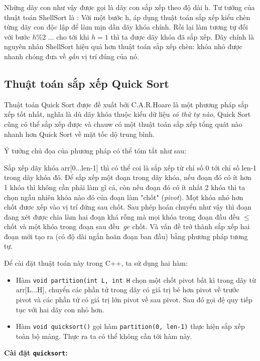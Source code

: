 \documentclass[8pt, a4paper]{article}
\newcommand{\mnt}[1]{\inputminted[frame=single, linenos=true, tabsize=4]{c++}{#1}}
\begin{document}
Những dãy con như vậy được gọi là dãy con sắp xếp theo độ dài h. Tư tưởng của thuật toán ShellSort là : Với một bước h, áp dụng thuật toán sắp xếp kiểu chèn từng dãy con độc lập để làm mịn dần dãy khóa chính. Rồi lại làm tương tự đối với bước $h \% 2$ ... cho tới khi $h=1$ thì ta được dãy khóa đã sắp xếp.
Đây chính là nguyên nhân ShellSort hiệu quả hơn thuật toán sắp xếp chèn: khóa nhỏ được nhanh chóng đưa về \emph{gần} vị trí đúng của nó.

\subsection{Thuật toán sắp xếp Quick Sort}

Thuật toán Quick Sort được đề xuất bởi C.A.R.Hoare là một phương pháp sắp xếp tốt nhất, nghĩa là dù dãy khóa thuộc kiểu dữ liệu \emph{có thứ tự nào}, Quick Sort cũng có thể sắp xếp được và chauw có một thuật toán sắp xếp tổng quát nào nhanh hơn Quick Sort về mặt tốc dộ trung bình. 

Ý tưởng chủ đọa của phương pháp có thể tóm tắt như sau:

Sắp xếp dãy khóa arr[0...len-1] thì có thể coi là sắp xếp từ chỉ số 0 tới chỉ số len-1 trong dãy khóa đó. Để sắp xếp một đoạn trong dãy khóa, nếu đoạn đó có ít hơn 1 khóa thì không cần phải làm gì cả, còn nếu đoạn đó có ít nhất 2 khóa thì ta chọn ngẫu nhiên khóa nào đó của đoạn làm "chốt" (\emph{pivot}). Mọt khóa nhỏ hơn chốt đươc xếp vào vị trí đứng sau chốt. Sau phép hoán chuyển như vậy thì đoạn đang xét được chia làm hai đoạn khá rỗng mà mọi khóa trong đoạn đầu đều $ \le $ chốt và một khóa trong đoạn sau đều $\ ge $ chốt. Và vấn đề trở thành sắp xếp hai đoạn mới tạo ra (có độ dài ngắn hoăn đoạn ban đầu) bằng phương pháp tương tự.

Để cài đặt thuật toán này trong C++, ta sử dụng hai hàm:

\begin{itemize} 
\item Hàm \texttt{void partition(int L, int H} chọn một chốt pivot bất kì trong dãy từ arr[L...H], chuyển các phần tử trong dãy có giá trị bé hơn pivot về trước pivot và các phần tử có giá trị lớn pivot về sau pivot. Sau đó gọi đệ quy tiếp tục với hai dãy con nhỏ hơn.
\item Hàm \texttt{void quicksort()} gọi hàm \texttt{partition(0, len-1)} thực hiện sắp xếp toàn bộ mảng. Thực ra ta có thể không cần tới hàm này.
\end{itemize}

\textbf{Cài đặt \texttt{quicksort}: }
\mnt{src/quicksort.cpp}
\end{document}
